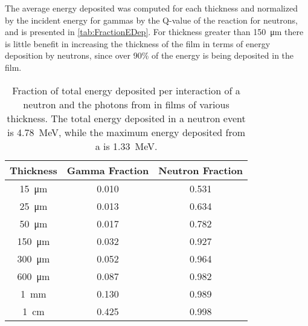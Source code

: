 The average energy deposited was computed for each thickness and normalized by the incident energy for gammas by the Q-value of the reaction for neutrons, and is presented in \autoref{tab:FractionEDep}.
For thickness greater than \SI{150}{\um} there is little benefit in increasing the thickness of the film in terms of energy deposition by neutrons, since over 90\% of the energy is being deposited in the film.
\begin{table}
    \caption[Fractional Energy Deposition per Interaction for Various Thickness]{Fraction of total energy deposited per interaction of a neutron and the photons from  in films of various thickness. The total energy deposited in a neutron event is \SI{4.78}{\MeV}, while the maximum energy deposited from a  is \SI{1.33}{\MeV}.\EnergyDepSimGeo}
      \label{tab:FractionEDep}
	\centering
	\begin{tabular}{c | c c}
\toprule
	Thickness & Gamma Fraction & Neutron Fraction \\
\midrule
	\SI{15}{\um} & 0.010 & 0.531 \\
	\SI{25}{\um} & 0.013 & 0.634 \\
	\SI{50}{\um} & 0.017 & 0.782 \\
	\SI{150}{\um} & 0.032 & 0.927 \\
	\SI{300}{\um} & 0.052 & 0.964 \\
	\SI{600}{\um} & 0.087 & 0.982 \\
	\SI{1}{\mm} & 0.130 & 0.989 \\
	\SI{1}{\cm} & 0.425 & 0.998 \\
\bottomrule
	\end{tabular}

\end{table}

